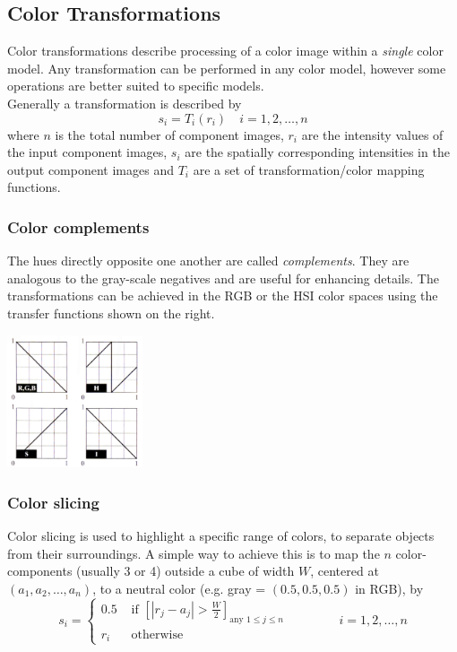 \subsection{Color Transformations }
Color transformations describe processing of a color image within a \textit{single} color model. Any transformation can be performed in any color model, however some operations are better suited to specific models. \\

Generally a transformation is described by
\begin{equation}
	s_i = T_i (r_i) \quad i = 1,2,\ldots,n
\end{equation}
where $n$ is the total number of component images, $r_i$ are the intensity values of the input component images, $s_i$ are the spatially corresponding intensities in the output component images and $T_i$ are a set of transformation/color mapping functions.

\subsubsection{Color complements }
\begin{minipage}{12cm}
	The hues directly opposite one another are called \textit{complements}. They are analogous to the gray-scale negatives and are useful for enhancing details. The transformations can be achieved in the RGB or the HSI color spaces using the transfer functions shown on the right.
\end{minipage}
\begin{minipage}{6cm}
	\centering
	\includegraphics[width=4cm]{images/ColorComplements.jpeg}
\end{minipage}

\subsubsection{Color slicing }
Color slicing is used to highlight a specific range of colors, to separate objects from their surroundings. A simple way to achieve this is to map the $n$ color-components (usually 3 or 4) outside a cube of width $W$, centered at $(a_1,a_2,\dots,a_n)$, to a neutral color (e.g. gray = $(0.5,0.5,0.5)$ in RGB), by
\begin{equation}
	s_i = \begin{cases}
		0.5 & \text{  if } \left[ \left| r_j - a_j \right| > \frac{W}{2} \right]_{\text{any } 1 \leq j \leq n} \\
		r_i & \text{  otherwise}
	\end{cases} \qquad \qquad i = 1,2,\dots,n
\end{equation}

